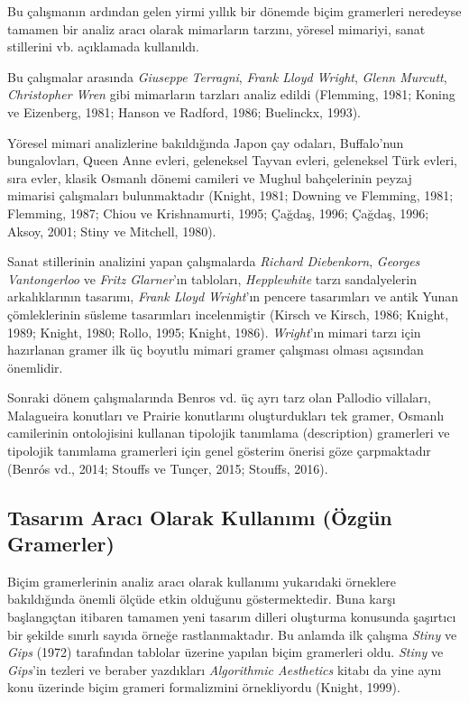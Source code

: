 \documentclass[12pt,turkish,a4paperpaper,]{report}
\begin{document}
Bu çalışmanın ardından gelen yirmi yıllık bir dönemde biçim gramerleri
neredeyse tamamen bir analiz aracı olarak mimarların tarzını, yöresel
mimariyi, sanat stillerini vb. açıklamada kullanıldı.

Bu çalışmalar arasında \emph{Giuseppe Terragni}, \emph{Frank Lloyd
Wright}, \emph{Glenn Murcutt}, \emph{Christopher Wren} gibi mimarların
tarzları analiz edildi (Flemming, 1981; Koning ve Eizenberg, 1981;
Hanson ve Radford, 1986; Buelinckx, 1993).

Yöresel mimari analizlerine bakıldığında Japon çay odaları, Buffalo'nun
bungalovları, Queen Anne evleri, geleneksel Tayvan evleri, geleneksel
Türk evleri, sıra evler, klasik Osmanlı dönemi camileri ve Mughul
bahçelerinin peyzaj mimarisi çalışmaları bulunmaktadır (Knight, 1981;
Downing ve Flemming, 1981; Flemming, 1987; Chiou ve Krishnamurti, 1995;
Çağdaş, 1996; Çağdaş, 1996; Aksoy, 2001; Stiny ve Mitchell, 1980).

Sanat stillerinin analizini yapan çalışmalarda \emph{Richard
Diebenkorn}, \emph{Georges Vantongerloo} ve \emph{Fritz Glarner}'ın
tabloları, \emph{Hepplewhite} tarzı sandalyelerin arkalıklarının
tasarımı, \emph{Frank Lloyd Wright}'ın pencere tasarımları ve antik
Yunan çömleklerinin süsleme tasarımları incelenmiştir (Kirsch ve Kirsch,
1986; Knight, 1989; Knight, 1980; Rollo, 1995; Knight, 1986).
\emph{Wright}'ın mimari tarzı için hazırlanan gramer ilk üç boyutlu
mimari gramer çalışması olması açısından önemlidir.

Sonraki dönem çalışmalarında Benros vd. üç ayrı tarz olan Pallodio
villaları, Malagueira konutları ve Prairie konutlarını oluşturdukları
tek gramer, Osmanlı camilerinin ontolojisini kullanan tipolojik
tanımlama (description) gramerleri ve tipolojik tanımlama gramerleri
için genel gösterim önerisi göze çarpmaktadır (Benrós vd., 2014; Stouffs
ve Tunçer, 2015; Stouffs, 2016).

\hypertarget{tasarux131m-aracux131-olarak-kullanux131mux131-uxf6zguxfcn-gramerler}{%
\subsection{Tasarım Aracı Olarak Kullanımı (Özgün
Gramerler)}\label{tasarux131m-aracux131-olarak-kullanux131mux131-uxf6zguxfcn-gramerler}}

Biçim gramerlerinin analiz aracı olarak kullanımı yukarıdaki örneklere
bakıldığında önemli ölçüde etkin olduğunu göstermektedir. Buna karşı
başlangıçtan itibaren tamamen yeni tasarım dilleri oluşturma konusunda
şaşırtıcı bir şekilde sınırlı sayıda örneğe rastlanmaktadır. Bu anlamda
ilk çalışma \emph{Stiny} ve \emph{Gips} (1972) tarafından tablolar
üzerine yapılan biçim gramerleri oldu. \emph{Stiny} ve \emph{Gips}'in
tezleri ve beraber yazdıkları \emph{Algorithmic Aesthetics} kitabı da
yine aynı konu üzerinde biçim grameri formalizmini örnekliyordu (Knight,
1999).
\end{document}
